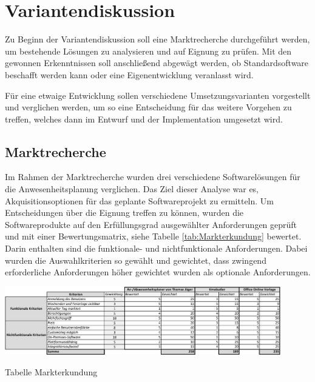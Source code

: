 \section{Variantendiskussion}
\label{sec:Variantendiskussion}
Zu Beginn der Variantendiskussion soll eine Marktrecherche durchgeführt werden, um bestehende Lösungen zu analysieren und auf Eignung zu prüfen. Mit den gewonnen Erkenntnissen soll anschließend abgewägt werden, ob Standardsoftware beschafft werden kann oder eine Eigenentwicklung veranlasst wird.

Für eine etwaige Entwicklung sollen verschiedene Umsetzungsvarianten vorgestellt und verglichen werden, um so eine Entscheidung für das weitere Vorgehen zu treffen, welches dann im Entwurf und der Implementation umgesetzt wird.

\subsection{Marktrecherche}
\label{sec:Marktrecherche}
Im Rahmen der Marktrecherche wurden drei verschiedene Softwarelösungen für die Anwesenheitsplanung verglichen. Das Ziel dieser Analyse war es, Akquisitionsoptionen für das geplante Softwareprojekt zu ermitteln. Um Entscheidungen über die Eignung treffen zu können, wurden die Softwareprodukte auf den Erfüllungsgrad ausgewählter Anforderungen geprüft und mit einer Bewertungsmatrix, siehe Tabelle \ref{tab:Markterkundung} bewertet. Darin enthalten sind die funktionale- und nichtfunktionale Anforderungen. Dabei wurden die Auswahlkriterien so gewählt und gewichtet, dass zwingend erforderliche Anforderungen höher gewichtet wurden als optionale Anforderungen.

\begin{table}[htbp]
    \centering
    \includegraphics[width=0.9\textwidth,angle=0]{abb/Markterkundung.pdf}
    \caption[Beschreibung]{ Tabelle Markterkundung}
    \label{tab:Markterkundung}
\end{table}

